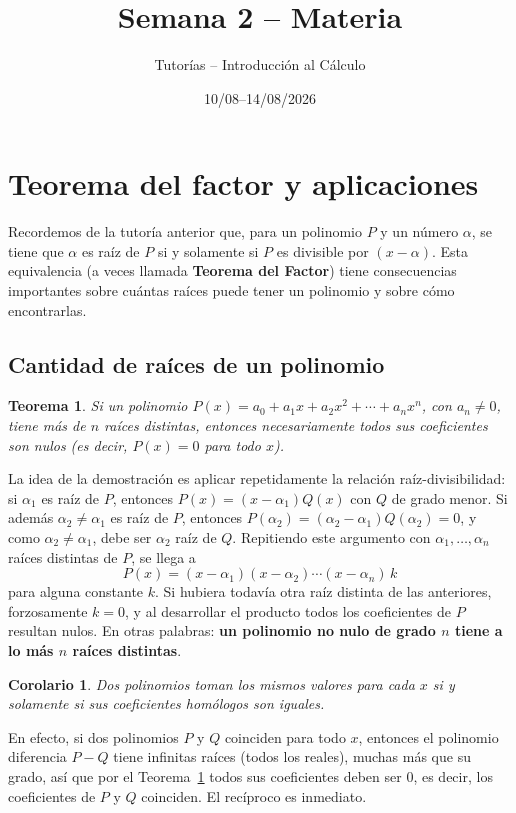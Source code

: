 \documentclass[11pt]{article}
\title{Semana 2 -- Materia}
\author{Tutorías -- Introducción al Cálculo}
\date{10/08--14/08/2026}
\newtheorem{teorema}{Teorema}[section]
\newtheorem{corolario}{Corolario}[section]
\theoremstyle{remark}
\begin{document}
\maketitle

\section{Teorema del factor y aplicaciones}

Recordemos de la tutoría anterior que, para un polinomio $P$ y un número
$\alpha$, se tiene que $\alpha$ es raíz de $P$ si y solamente si $P$ es
divisible por $(x-\alpha)$. Esta equivalencia (a veces llamada
\textbf{Teorema del Factor}) tiene consecuencias importantes sobre cuántas
raíces puede tener un polinomio y sobre cómo encontrarlas.

\subsection{Cantidad de raíces de un polinomio}

\begin{teorema}\label{teo:raices}
Si un polinomio $P(x) = a_0 + a_1x + a_2x^2 + \cdots + a_nx^n$, con $a_n \neq 0$,
tiene más de $n$ raíces distintas, entonces necesariamente todos sus
coeficientes son nulos (es decir, $P(x)=0$ para todo $x$).
\end{teorema}

La idea de la demostración es aplicar repetidamente la relación raíz-divisibilidad:
si $\alpha_1$ es raíz de $P$, entonces $P(x) = (x-\alpha_1)Q(x)$ con $Q$ de
grado menor. Si además $\alpha_2 \neq \alpha_1$ es raíz de $P$, entonces
$P(\alpha_2) = (\alpha_2-\alpha_1)Q(\alpha_2) = 0$, y como $\alpha_2 \neq
\alpha_1$, debe ser $\alpha_2$ raíz de $Q$. Repitiendo este argumento con
$\alpha_1,\dots,\alpha_n$ raíces distintas de $P$, se llega a
$$P(x) = (x-\alpha_1)(x-\alpha_2)\cdots(x-\alpha_n)\,k$$
para alguna constante $k$. Si hubiera todavía otra raíz distinta de las
anteriores, forzosamente $k=0$, y al desarrollar el producto todos los
coeficientes de $P$ resultan nulos. En otras palabras: \textbf{un polinomio no
nulo de grado $n$ tiene a lo más $n$ raíces distintas}.

\begin{corolario}
Dos polinomios toman los mismos valores para cada $x$ si y solamente si sus
coeficientes homólogos son iguales.
\end{corolario}

En efecto, si dos polinomios $P$ y $Q$ coinciden para todo $x$, entonces el
polinomio diferencia $P-Q$ tiene infinitas raíces (todos los reales), muchas
más que su grado, así que por el Teorema~\ref{teo:raices} todos sus
coeficientes deben ser $0$, es decir, los coeficientes de $P$ y $Q$ coinciden.
El recíproco es inmediato.
\end{document}
